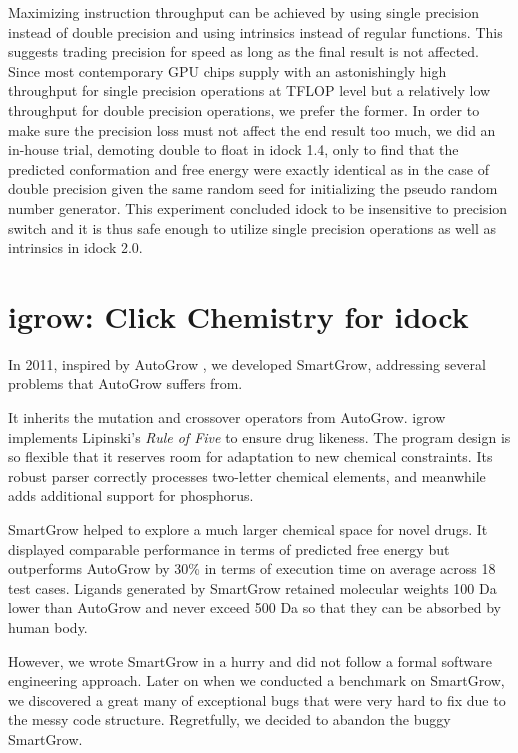 Maximizing instruction throughput can be achieved by using single precision instead of double precision and using intrinsics instead of regular functions. This suggests trading precision for speed as long as the final result is not affected. Since most contemporary GPU chips supply with an astonishingly high throughput for single precision operations at TFLOP level but a relatively low throughput for double precision operations, we prefer the former. In order to make sure the precision loss must not affect the end result too much, we did an in-house trial, demoting double to float in idock 1.4, only to find that the predicted conformation and free energy were exactly identical as in the case of double precision given the same random seed for initializing the pseudo random number generator. This experiment concluded idock to be insensitive to precision switch and it is thus safe enough to utilize single precision operations as well as intrinsics in idock 2.0.

\section{igrow: Click Chemistry for idock}

In 2011, inspired by AutoGrow \citep{466}, we developed SmartGrow, addressing several problems that AutoGrow suffers from.

It inherits the mutation and crossover operators from AutoGrow. igrow implements Lipinski's \textit{Rule of Five} \citep{168} to ensure drug likeness. The program design is so flexible that it reserves room for adaptation to new chemical constraints. Its robust parser correctly processes two-letter chemical elements, and meanwhile adds additional support for phosphorus.

SmartGrow helped to explore a much larger chemical space for novel drugs. It displayed comparable performance in terms of predicted free energy but outperforms AutoGrow by 30\% in terms of execution time on average across 18 test cases. Ligands generated by SmartGrow retained molecular weights 100 Da lower than AutoGrow and never exceed 500 Da so that they can be absorbed by human body. 

However, we wrote SmartGrow in a hurry and did not follow a formal software engineering approach. Later on when we conducted a benchmark on SmartGrow, we discovered a great many of exceptional bugs that were very hard to fix due to the messy code structure. Regretfully, we decided to abandon the buggy SmartGrow.

